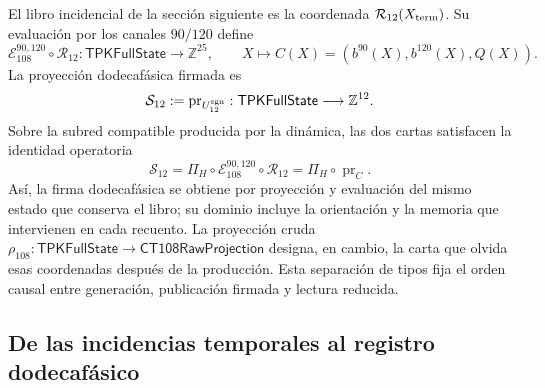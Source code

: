 El libro incidencial de la sección siguiente es la coordenada
\(\mathcal R_{12}(X_{\rm term})\). Su evaluación por los canales
\(90/120\) define
\[
 \mathcal E_{108}^{90,120}\circ\mathcal R_{12}:
 \mathsf{TPKFullState}\longrightarrow\mathbb Z^{25},
 \qquad
 X\longmapsto C(X)=(b^{90}(X),b^{120}(X),Q(X)).
\]
La proyección dodecafásica firmada es
\[
 \mathcal S_{12}:=\operatorname{pr}_{U_{12}^{\rm sgn}}:
 \mathsf{TPKFullState}\longrightarrow\mathbb Z^{12}.
\]
Sobre la subred compatible producida por la dinámica, las dos cartas
satisfacen la identidad operatoria
\begin{equation}
 \mathcal S_{12}
 =\Pi_H\circ\mathcal E_{108}^{90,120}\circ\mathcal R_{12}
 =\Pi_H\circ\operatorname{pr}_{C}.
 \label{vi:vi:dep:identidad-productor-e108}
\end{equation}
Así, la firma dodecafásica se obtiene por proyección y evaluación del mismo
estado que conserva el libro; su dominio incluye la orientación y la memoria
que intervienen en cada recuento. La proyección cruda
\(\rho_{108}:\mathsf{TPKFullState}\to\mathsf{CT108RawProjection}\)
designa, en cambio, la carta que olvida esas coordenadas después de la
producción. Esta separación de tipos fija el orden causal entre generación,
publicación firmada y lectura reducida.

\subsection{De las incidencias temporales al registro dodecafásico}
\label{vi:vi:dep:registro}\label{vi:subsec:k-registro-integral}

